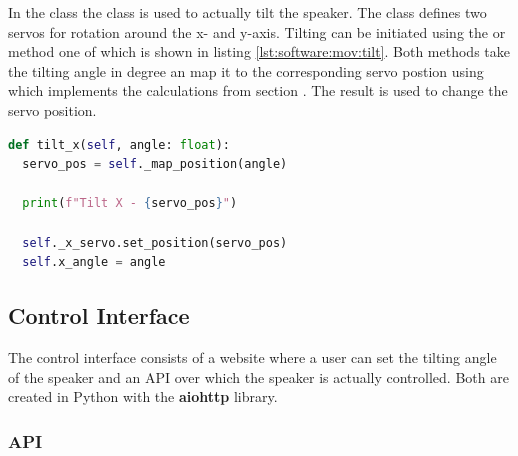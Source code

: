 %
In the class  the  class is used to actually tilt the speaker. The class defines two servos for rotation around the x- and y-axis. Tilting can be initiated using the  or  method one of which is shown in listing \ref{lst:software:mov:tilt}. Both methods take the tilting angle in degree an map it to the corresponding servo postion using  which implements the calculations from section . The result is used to change the servo position.
%
\begin{mdframed}
\begin{lstlisting}[language=python, caption=Method for titling the speaker around the x-axis, label=lst:software:mov:tilt]
def tilt_x(self, angle: float):
  servo_pos = self._map_position(angle)

  print(f"Tilt X - {servo_pos}")

  self._x_servo.set_position(servo_pos)
  self.x_angle = angle
\end{lstlisting}
\end{mdframed}

\subsection{Control Interface}
%
The control interface consists of a website where a user can set the tilting angle of the speaker and an API over which the speaker is actually controlled. Both are created in Python with the \textbf{aiohttp} library.\cite{noauthor_aiohttp_nodate}

\subsubsection*{API}


